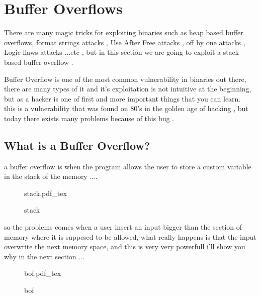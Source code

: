 \documentclass[10pt,a4paper]{article} %
\newcommand{\incfig}[1]{%
    \def\svgwidth{\columnwidth}
    {#1.pdf_tex}
}
\begin{document}
    \section{Buffer Overflows}
        There are many magic tricks for exploiting binaries such as heap
        based buffer overflows, format strings attacks , Use After Free attacks
        , off by one attacks , Logic flaws attacks ...etc , but in this section
        we are going to exploit a stack based buffer overflow .

        Buffer Overflow is one of the most common vulnerability in binaries out
        there, there are many types of it and it's exploitation is not intuitive at
        the beginning, but as a hacker is one of first and more important things
        that you can learn.
        \\ this is a vulnerability that was found on 80's in the golden age of
        hacking , but today there exists many problems because of this bug .
        \subsection{What is a Buffer Overflow?}
            a buffer overflow is when the program allows the user to store a custom
            variable in the stack of the memory ....
            \begin{figure}[h!]
                \centering
                \incfig{stack}
                \caption{stack}
                \label{fig:stack}
            \end{figure}
            so the problems comes when a user insert an input bigger than the
            section of memory where it is suppesed to be allowed, what really
            happens is that the input overwrite the next memory space, and this is
            very very powerfull i'll show you why in the next section ...
            \begin{figure}[h!]
                \centering
                \incfig{bof}
                \caption{bof}
                \label{fig:bof}
            \end{figure}
                    \newpage
\end{document}
